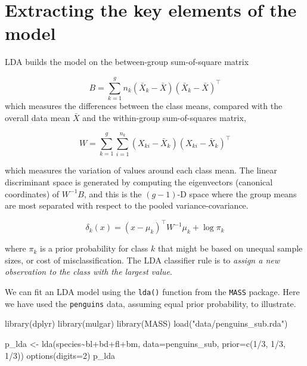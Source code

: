 \documentclass[
  letterpaper,
]{book}
\newenvironment{Shaded}{\begin{snugshade}}{\end{snugshade}}
\newcommand{\AttributeTok}[1]{\textcolor[rgb]{0.40,0.45,0.13}{#1}}
\newcommand{\DecValTok}[1]{\textcolor[rgb]{0.68,0.00,0.00}{#1}}
\newcommand{\FunctionTok}[1]{\textcolor[rgb]{0.28,0.35,0.67}{#1}}
\newcommand{\NormalTok}[1]{\textcolor[rgb]{0.00,0.23,0.31}{#1}}
\newcommand{\OtherTok}[1]{\textcolor[rgb]{0.00,0.23,0.31}{#1}}
\newcommand{\SpecialCharTok}[1]{\textcolor[rgb]{0.37,0.37,0.37}{#1}}
\newcommand{\StringTok}[1]{\textcolor[rgb]{0.13,0.47,0.30}{#1}}
\begin{document}
\hypertarget{extracting-the-key-elements-of-the-model}{%
\section{Extracting the key elements of the
model}\label{extracting-the-key-elements-of-the-model}}

LDA builds the model on the between-group sum-of-square matrix

\[B=\sum_{k=1}^g n_k(\bar{X}_k-\bar{X})(\bar{X}_k-\bar{X})^\top\] which
measures the differences between the class means, compared with the
overall data mean \(\bar{X}\) and the within-group sum-of-squares
matrix,

\[W =
\sum_{k=1}^g\sum_{i=1}^{n_k}
(X_{ki}-\bar{X}_k)(X_{ki}-\bar{X}_k)^\top\]

which measures the variation of values around each class mean. The
linear discriminant space is generated by computing the eigenvectors
(canonical coordinates) of \(W^{-1}B\), and this is the \((g-1)\)-D
space where the group means are most separated with respect to the
pooled variance-covariance.

\[
\delta_k(x) = (x-\mu_k)^\top W^{-1}\mu_k + \log \pi_k
\]

where \(\pi_k\) is a prior probability for class \(k\) that might be
based on unequal sample sizes, or cost of misclassification. The LDA
classifier rule is to \emph{assign a new observation to the class with
the largest value}.

We can fit an LDA model using the \texttt{lda()} function from the
\texttt{MASS} package. Here we have used the \texttt{penguins} data,
assuming equal prior probability, to illustrate.

\begin{Shaded}
\begin{Highlighting}[]
\FunctionTok{library}\NormalTok{(dplyr)}
\FunctionTok{library}\NormalTok{(mulgar)}
\FunctionTok{library}\NormalTok{(MASS)}
\FunctionTok{load}\NormalTok{(}\StringTok{"data/penguins\_sub.rda"}\NormalTok{)}

\NormalTok{p\_lda }\OtherTok{\textless{}{-}} \FunctionTok{lda}\NormalTok{(species}\SpecialCharTok{\textasciitilde{}}\NormalTok{bl}\SpecialCharTok{+}\NormalTok{bd}\SpecialCharTok{+}\NormalTok{fl}\SpecialCharTok{+}\NormalTok{bm, }\AttributeTok{data=}\NormalTok{penguins\_sub, }\AttributeTok{prior=}\FunctionTok{c}\NormalTok{(}\DecValTok{1}\SpecialCharTok{/}\DecValTok{3}\NormalTok{, }\DecValTok{1}\SpecialCharTok{/}\DecValTok{3}\NormalTok{, }\DecValTok{1}\SpecialCharTok{/}\DecValTok{3}\NormalTok{))}
\FunctionTok{options}\NormalTok{(}\AttributeTok{digits=}\DecValTok{2}\NormalTok{)}
\NormalTok{p\_lda}
\end{Highlighting}
\end{Shaded}
\end{document}
